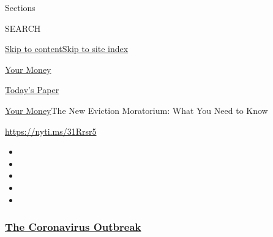 Sections

SEARCH

\protect\hyperlink{site-content}{Skip to
content}\protect\hyperlink{site-index}{Skip to site index}

\href{https://www.nytimes3xbfgragh.onion/section/your-money}{Your Money}

\href{https://myaccount.nytimes3xbfgragh.onion/auth/login?response_type=cookie\&client_id=vi}{}

\href{https://www.nytimes3xbfgragh.onion/section/todayspaper}{Today's
Paper}

\href{/section/your-money}{Your Money}\textbar{}The New Eviction
Moratorium: What You Need to Know

\url{https://nyti.ms/31Rrsr5}

\begin{itemize}
\item
\item
\item
\item
\item
\end{itemize}

\hypertarget{the-coronavirus-outbreak}{%
\subsubsection{\texorpdfstring{\href{https://www.nytimes3xbfgragh.onion/news-event/coronavirus?name=styln-coronavirus-national\&region=TOP_BANNER\&block=storyline_menu_recirc\&action=click\&pgtype=Article\&impression_id=7c097730-f52d-11ea-84d7-f589d7b1ff3e\&variant=undefined}{The
Coronavirus
Outbreak}}{The Coronavirus Outbreak}}\label{the-coronavirus-outbreak}}

